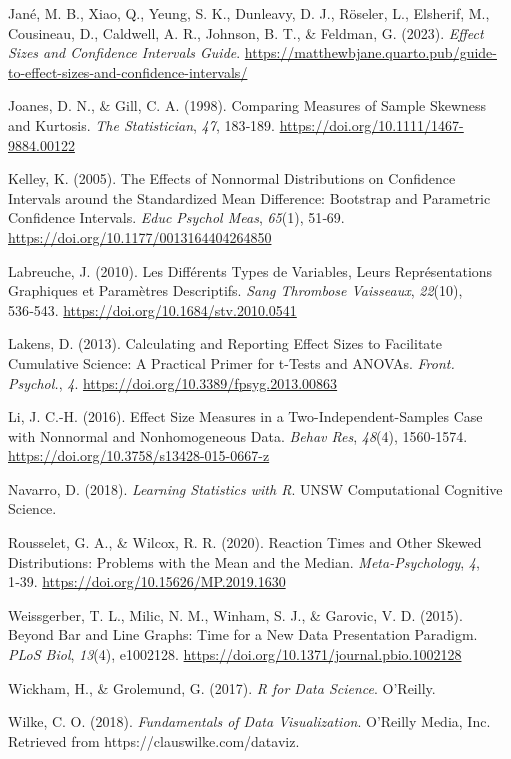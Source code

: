 \documentclass[
  letterpaper,
]{book}
\newlength{\cslhangindent}
\newenvironment{CSLReferences}[2] %
 {\begin{list}{}{%
  \setlength{\itemindent}{0pt}
  \setlength{\leftmargin}{0pt}
  \setlength{\parsep}{0pt}
  \ifodd #1
   \setlength{\leftmargin}{\cslhangindent}
   \setlength{\itemindent}{-1\cslhangindent}
  \fi
  \setlength{\itemsep}{#2\baselineskip}}}
 {\end{list}}
\begin{document}
\begin{CSLReferences}{1}{0}
Jané, M. B., Xiao, Q., Yeung, S. K., Dunleavy, D. J., Röseler, L.,
Elsherif, M., Cousineau, D., Caldwell, A. R., Johnson, B. T., \&
Feldman, G. (2023). \emph{Effect Sizes and Confidence Intervals Guide}.
\url{https://matthewbjane.quarto.pub/guide-to-effect-sizes-and-confidence-intervals/}

Joanes, D. N., \& Gill, C. A. (1998). Comparing Measures of Sample
Skewness and Kurtosis. \emph{The Statistician}, \emph{47}, 183‑189.
\url{https://doi.org/10.1111/1467-9884.00122}

Kelley, K. (2005). The {Effects} of Nonnormal Distributions on
Confidence {Intervals} around the Standardized Mean Difference:
Bootstrap and Parametric Confidence Intervals. \emph{Educ Psychol Meas},
\emph{65}(1), 51‑69. \url{https://doi.org/10.1177/0013164404264850}

Labreuche, J. (2010). Les Différents Types de Variables, Leurs
Représentations Graphiques et Paramètres Descriptifs. \emph{Sang
Thrombose Vaisseaux}, \emph{22}(10), 536‑543.
\url{https://doi.org/10.1684/stv.2010.0541}

Lakens, D. (2013). Calculating and Reporting Effect Sizes to Facilitate
Cumulative Science: A Practical Primer for t-Tests and {ANOVAs}.
\emph{Front. Psychol.}, \emph{4}.
\url{https://doi.org/10.3389/fpsyg.2013.00863}

Li, J. C.-H. (2016). Effect Size Measures in a Two-Independent-Samples
Case with Nonnormal and Nonhomogeneous Data. \emph{Behav Res},
\emph{48}(4), 1560‑1574. \url{https://doi.org/10.3758/s13428-015-0667-z}

Navarro, D. (2018). \emph{Learning Statistics with {R}}. UNSW
Computational Cognitive Science.

Rousselet, G. A., \& Wilcox, R. R. (2020). Reaction Times and Other
Skewed Distributions: Problems with the Mean and the Median.
\emph{Meta-Psychology}, \emph{4}, 1‑39.
\url{https://doi.org/10.15626/MP.2019.1630}

Weissgerber, T. L., Milic, N. M., Winham, S. J., \& Garovic, V. D.
(2015). Beyond Bar and Line Graphs: Time for a New Data Presentation
Paradigm. \emph{PLoS Biol}, \emph{13}(4), e1002128.
\url{https://doi.org/10.1371/journal.pbio.1002128}

Wickham, H., \& Grolemund, G. (2017). \emph{R for {Data Science}}.
O'Reilly.

Wilke, C. O. (2018). \emph{Fundamentals of Data Visualization}. O'Reilly
Media, Inc. Retrieved from https://clauswilke.com/dataviz.

\end{CSLReferences}


\backmatter
\end{document}
